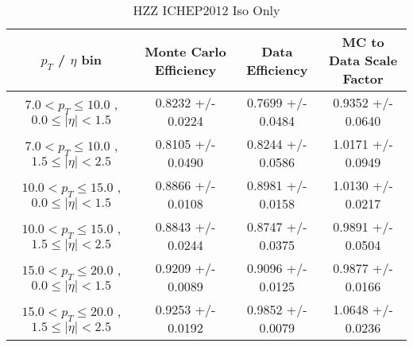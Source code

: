  \begin{table}[!ht]
 \begin{center} 
 \begin{tabular}{|c|c|c|c|}
 \hline
 $p_{T}$ / $\eta$ bin    &  Monte Carlo Efficiency    &  Data Efficiency   &  MC to Data Scale Factor \\   \hline           
$  7.0 < p_{T} \le  10.0$ , $  0.0  \le |\eta| <   1.5$   &       0.8232 +/- 0.0224   &       0.7699 +/- 0.0484   &       0.9352 +/- 0.0640   \\   
\hline
$  7.0 < p_{T} \le  10.0$ , $  1.5  \le |\eta| <   2.5$   &       0.8105 +/- 0.0490   &       0.8244 +/- 0.0586   &       1.0171 +/- 0.0949   \\   
\hline
$ 10.0 < p_{T} \le  15.0$ , $  0.0  \le |\eta| <   1.5$   &       0.8866 +/- 0.0108   &       0.8981 +/- 0.0158   &       1.0130 +/- 0.0217   \\   
\hline
$ 10.0 < p_{T} \le  15.0$ , $  1.5  \le |\eta| <   2.5$   &       0.8843 +/- 0.0244   &       0.8747 +/- 0.0375   &       0.9891 +/- 0.0504   \\   
\hline
$ 15.0 < p_{T} \le  20.0$ , $  0.0  \le |\eta| <   1.5$   &       0.9209 +/- 0.0089   &       0.9096 +/- 0.0125   &       0.9877 +/- 0.0166   \\   
\hline
$ 15.0 < p_{T} \le  20.0$ , $  1.5  \le |\eta| <   2.5$   &       0.9253 +/- 0.0192   &       0.9852 +/- 0.0079   &       1.0648 +/- 0.0236   \\   
\hline
\end{tabular}
\caption{HZZ ICHEP2012 Iso Only}
\label{tab:eff_ele_offline}
\end{center}
\end{table}



